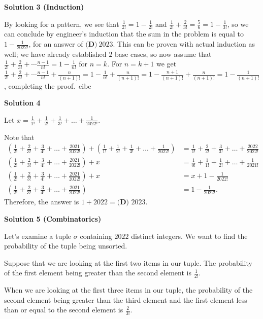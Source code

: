 \begin{enumerate}
 



\textbf{Solution 3 (Induction)}

By looking for a pattern, we see that $\frac{1}{2!} = 1 - \frac{1}{2!}$ and $\frac{1}{2!} + \frac{2}{3!} = \frac{5}{6} = 1 - \frac{1}{3!}$, so we can conclude by engineer's induction that the sum in the problem is equal to $1 - \frac{1}{2022!}$, for an answer of $\boxed{\textbf{(D)}\ 2023}$. This can be proven with actual induction as well; we have already established $2$ base cases, so now assume that $\frac{1}{2!} + \frac{2}{3!} + \cdots \frac{n-1}{n!} = 1 - \frac{1}{n!}$ for $n = k$. For $n = k + 1$ we get $\frac{1}{2!} + \frac{2}{3!} + \cdots \frac{n-1}{n!} + \frac{n}{(n+1)!} = 1 - \frac{1}{n!} + \frac{n}{(n+1)!} = 1 - \frac{n+1}{(n+1)!} + \frac{n}{(n+1)!} = 1 - \frac{1}{(n+1)!}$, completing the proof.~eibc

 



\textbf{Solution 4}

Let $x=\frac{1}{1!}+\frac{1}{2!}+\frac{1}{3!}+\dots+\frac{1}{2022!}.$

 Note that 
 \begin{align*} \left(\frac{1}{2!}+\frac{2}{3!}+\frac{3}{4!}+\dots+\frac{2021}{2022!}\right)+\left(\frac{1}{1!}+\frac{1}{2!}+\frac{1}{3!}+\dots+\frac{1}{2022!}\right)&=\frac{1}{1!}+\frac{2}{2!}+\frac{3}{3!}+\dots+\frac{2022}{2022!}\\ \left(\frac{1}{2!}+\frac{2}{3!}+\frac{3}{4!}+\dots+\frac{2021}{2022!}\right)+x&=\frac{1}{0!}+\frac{1}{1!}+\frac{1}{2!}+\dots+\frac{1}{2021!}\\ \left(\frac{1}{2!}+\frac{2}{3!}+\frac{3}{4!}+\dots+\frac{2021}{2022!}\right)+x&=x+1-\frac{1}{2022!}\\ \left(\frac{1}{2!}+\frac{2}{3!}+\frac{3}{4!}+\dots+\frac{2021}{2022!}\right)&=1-\frac{1}{2022!}. \end{align*}
Therefore, the answer is $1+2022=\boxed{\textbf{(D) }2023}.$




\textbf{Solution 5 (Combinatorics)}

Let's examine a tuple $\sigma$ containing $2022$ distinct integers. We want to find the probability of the tuple being unsorted.

 Suppose that we are looking at the first two items in our tuple. The probability of the first element being greater than the second element is $\frac{1}{2!}$.

 When we are looking at the first three items in our tuple, the probability of the second element being greater than the third element and the first element less than or equal to the second element is $\frac{2}{3!}$.


\end{enumerate}
